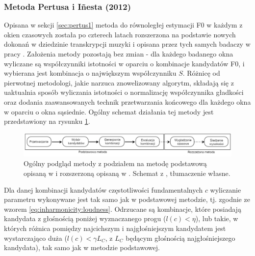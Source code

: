 \documentclass[12pt,a4paper,twoside]{mwart}
\begin{document}
\subsubsection{Metoda Pertusa i Iñesta (2012)}\label{sec:petrus2}
Opisana w sekcji \ref{sec:pertus1} metoda do równoległej estymacji F0 w każdym z okien czasowych została po czterech latach rozszerzona na podstawie nowych dokonań w dziedzinie transkrypcji muzyki i opisana przez tych samych badaczy w pracy \cite{Transcription:Pertus:Inharmonicity2}. Założenia metody pozostają bez zmian - dla każdego badanego okna wyliczane są współczynniki istotności w oparciu o kombinacje kandydatów F0, i wybierana jest kombinacja o największym współczynniku $S$. Różnicę od pierwotnej metodologi, jakie narzuca znowelizowany algorytm, składają się z uaktualnia sposób wyliczania istotności o normalizację współczynnika gładkości oraz dodania zaawansowanych technik przetwarzania końcowego dla każdego okna w oparciu o okna sąsiednie. Ogólny schemat działania tej metody jest przedstawiony na rysunku \ref{fig:petrusa_2012_methodology}.

\begin{figure}[ht]
  \begin{center}
    \includegraphics[scale=0.31]{images/Pertusa_2012_methodology.png}
    \caption{Ogólny podgląd metody z podziałem na metodę podstawową opisaną w \cite{Transcription:Pertus:Inharmonicity} i rozszerzoną opisaną w \cite{Transcription:Pertus:Inharmonicity2}. Schemat z \cite[3]{Transcription:Pertus:Inharmonicity2}, tłumaczenie własne.}
    \label{fig:petrusa_2012_methodology}
  \end{center}
\end{figure}

Dla danej kombinacji kandydatów częstotliwości fundamentalnych $c$ wyliczanie parametru wykonywane jest tak samo jak w podstawowej metodzie, tj. zgodnie ze wzorem \ref{eq:inharmonicity:loudness}. Odrzucane są kombinacje, które posiadają kandydata z głośnością poniżej wyznaczanego progu ($l(c) < \eta$), lub takie, w których różnica pomiędzy najcichszym i najgłośniejszym kandydatem jest wystarczająco duża ($l(c) < \gamma L_C$, z $L_C$ będącym głośnością najgłośniejszego kandydata), tak samo jak w metodzie podstawowej.
\end{document}
